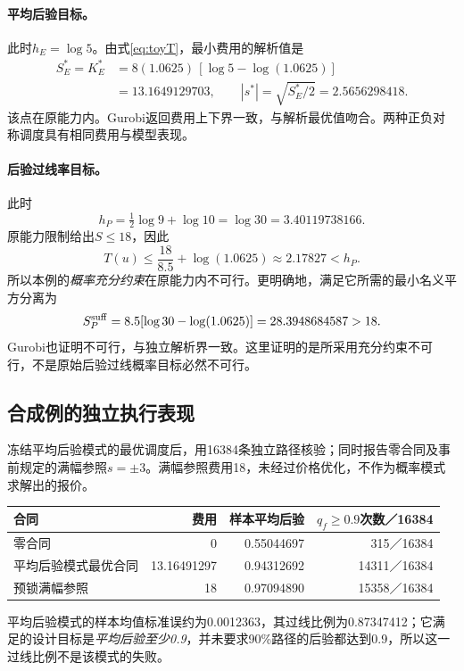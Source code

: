 \documentclass[UTF8,11pt,a4paper,fontset=fandol]{ctexart}
\numberwithin{equation}{section}
\begin{document}
\paragraph{平均后验目标。}
此时$h_E=\log5$。由式\eqref{eq:toyT}，最小费用的解析值是
\begin{equation}
\begin{aligned}
S_E^*=K_E^*
&=8(1.0625)\,[\log5-\log(1.0625)]\\
&=13.1649129703,\qquad
|s^*|=\sqrt{S_E^*/2}=2.5656298418.
\end{aligned}
\end{equation}
该点在原能力内。Gurobi返回费用上下界一致，与解析最优值吻合。两种正负对称调度具有相同费用与模型表现。

\paragraph{后验过线率目标。}
此时
\begin{equation}
h_P=\tfrac12\log9+\log10=\log30
=3.40119738166.
\end{equation}
原能力限制给出$S\le18$，因此
\begin{equation}
T(u)\le\frac{18}{8.5}+\log(1.0625)
\approx2.17827<h_P.
\end{equation}
所以本例的\emph{概率充分约束}在原能力内不可行。更明确地，满足它所需的最小名义平方分离为
\begin{equation}
S_P^{\rm suff}=8.5[\log30-\log(1.0625)]
=28.3948684587>18.
\end{equation}
Gurobi也证明不可行，与独立解析界一致。这里证明的是所采用充分约束不可行，不是原始后验过线概率目标必然不可行。

\subsection{合成例的独立执行表现}
冻结平均后验模式的最优调度后，用16384条独立路径核验；同时报告零合同及事前规定的满幅参照$s=\pm3$。满幅参照费用18，未经过价格优化，不作为概率模式求解出的报价。
\begin{center}\small
\begin{tabular}{lrrr}\toprule
合同&费用&样本平均后验&$q_f\ge0.9$次数／16384\\\midrule
零合同&0&0.55044697&315／16384\\
平均后验模式最优合同&13.16491297&0.94312692&14311／16384\\
预锁满幅参照&18&0.97094890&15358／16384\\\bottomrule
\end{tabular}
\end{center}
平均后验模式的样本均值标准误约为0.0012363，其过线比例为0.87347412；它满足的设计目标是\emph{平均后验至少0.9}，并未要求90\%路径的后验都达到0.9，所以这一过线比例不是该模式的失败。
\end{document}
